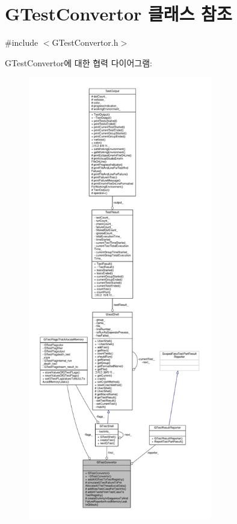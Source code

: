 \hypertarget{class_g_test_convertor}{}\section{G\+Test\+Convertor 클래스 참조}
\label{class_g_test_convertor}


{\ttfamily \#include $<$G\+Test\+Convertor.\+h$>$}



G\+Test\+Convertor에 대한 협력 다이어그램\+:
\nopagebreak
\begin{figure}[H]
\begin{center}
\leavevmode
\includegraphics[height=550pt]{class_g_test_convertor__coll__graph}
\end{center}
\end{figure}
